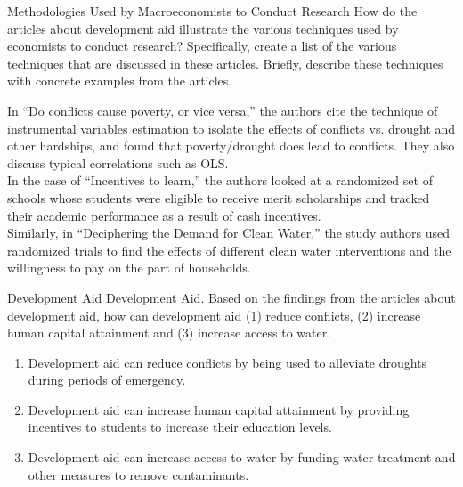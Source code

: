 \documentclass[10pt]{extarticle}
\begin{document}
  \begin{problem}{Methodologies Used by Macroeconomists to Conduct Research}
    How do the articles about development aid illustrate the various techniques used by economists to conduct research? Specifically, create a list of the various techniques that are discussed in these articles. Briefly, describe these techniques with concrete examples from the articles.
  \end{problem}
  \begin{solution}
    In ``Do conflicts cause poverty, or vice versa,'' the authors cite the technique of instrumental variables estimation to isolate the effects of conflicts vs. drought and other hardships, and found that poverty/drought does lead to conflicts. They also discuss typical correlations such as OLS.\\

    In the case of ``Incentives to learn,'' the authors looked at a randomized set of schools whose students were eligible to receive merit scholarships and tracked their academic performance as a result of cash incentives.\\

    Similarly, in ``Deciphering the Demand for Clean Water,'' the study authors used randomized trials to find the effects of different clean water interventions and the willingness to pay on the part of households.
  \end{solution}
  \begin{problem}{Development Aid}
    Development Aid. Based on the findings from the articles about development aid, how can development aid (1) reduce conflicts, (2) increase human capital attainment and (3) increase access to water.
  \end{problem}
  \begin{solution}
    \begin{enumerate}[(1)]
      \item Development aid can reduce conflicts by being used to alleviate droughts during periods of emergency.
      \item Development aid can increase human capital attainment by providing incentives to students to increase their education levels.
      \item Development aid can increase access to water by funding water treatment and other measures to remove contaminants.
    \end{enumerate}
  \end{solution}
\end{document}
